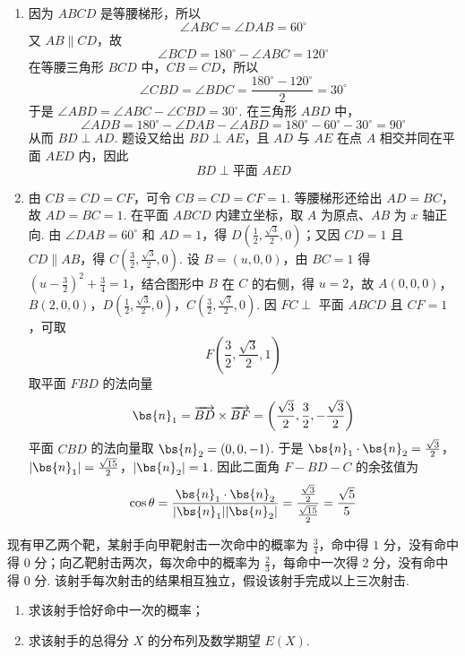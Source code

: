 \begin{solution}
\begin{enumerate}
\item
因为 \(ABCD\) 是等腰梯形，所以
\[
\angle ABC=\angle DAB=60^\circ
\]
又 \(AB\parallel CD\)，故
\[
\angle BCD=180^\circ-\angle ABC=120^\circ
\]
在等腰三角形 \(BCD\) 中，\(CB=CD\)，所以
\[
\angle CBD=\angle BDC=\frac{180^\circ-120^\circ}{2}=30^\circ
\]
于是 \(\angle ABD=\angle ABC-\angle CBD=30^\circ\). 在三角形 \(ABD\) 中，
\[
\angle ADB=180^\circ-\angle DAB-\angle ABD
=180^\circ-60^\circ-30^\circ=90^\circ
\]
从而 \(BD\perp AD\). 题设又给出 \(BD\perp AE\)，且 \(AD\) 与 \(AE\) 在点 \(A\) 相交并同在平面 \(AED\) 内，因此
\[
BD\perp\text{平面 }AED
\]
\item
由 \(CB=CD=CF\)，可令 \(CB=CD=CF=1\). 等腰梯形还给出 \(AD=BC\)，故 \(AD=BC=1\). 在平面 \(ABCD\) 内建立坐标，取 \(A\) 为原点、\(AB\) 为 \(x\) 轴正向. 由 \(\angle DAB=60^\circ\) 和 \(AD=1\)，得 \(D\left(\frac12,\frac{\sqrt3}{2},0\right)\)；又因 \(CD=1\) 且 \(CD\parallel AB\)，得 \(C\left(\frac32,\frac{\sqrt3}{2},0\right)\). 设 \(B=(u,0,0)\)，由 \(BC=1\) 得 \((u-\frac32)^2+\frac34=1\)，结合图形中 \(B\) 在 \(C\) 的右侧，得 \(u=2\)，故
\(A(0,0,0)\)，\(B(2,0,0)\)，\(D\left(\frac12,\frac{\sqrt3}{2},0\right)\)，\(C\left(\frac32,\frac{\sqrt3}{2},0\right)\).
因 \(FC\perp\) 平面 \(ABCD\) 且 \(CF=1\)，可取
\[
F\left(\frac32,\frac{\sqrt3}{2},1\right)
\]
取平面 \(FBD\) 的法向量
\[
\bs{n}_1=\overrightarrow{BD}\times\overrightarrow{BF}
=\left(\frac{\sqrt3}{2},\frac32,-\frac{\sqrt3}{2}\right)
\]
平面 \(CBD\) 的法向量取 \(\bs{n}_2=(0,0,-1)\). 于是
\(\bs{n}_1\cdot\bs{n}_2=\frac{\sqrt3}{2}\)，\(|\bs{n}_1|=\frac{\sqrt{15}}2\)，\(|\bs{n}_2|=1\).
因此二面角 \(F-BD-C\) 的余弦值为
\[
\cos\theta
=\frac{\bs{n}_1\cdot\bs{n}_2}
 {|\bs{n}_1||\bs{n}_2|}
=\frac{\frac{\sqrt3}{2}}{\frac{\sqrt{15}}{2}}
=\frac{\sqrt5}{5}
\]
\end{enumerate}
\end{solution}

\begin{problem}
现有甲乙两个靶，某射手向甲靶射击一次命中的概率为 \(\frac{3}{4}\)，命中得 \(1\) 分，没有命中得 \(0\) 分；向乙靶射击两次，每次命中的概率为 \(\frac{2}{3}\)，每命中一次得 \(2\) 分，没有命中得 \(0\) 分. 该射手每次射击的结果相互独立，假设该射手完成以上三次射击.
\begin{enumerate}
\item 求该射手恰好命中一次的概率；
\item 求该射手的总得分 \(X\) 的分布列及数学期望 \(E(X)\).
\end{enumerate}
\end{problem}

